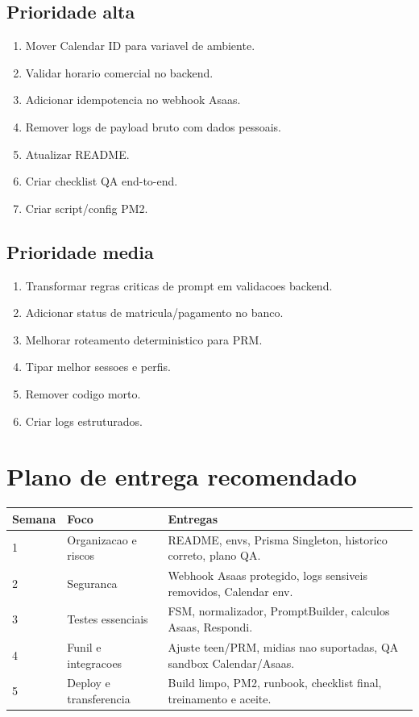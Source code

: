 \documentclass[11pt,a4paper]{article}
\begin{document}
\subsection{Prioridade alta}

\begin{enumerate}
  \item Mover Calendar ID para variavel de ambiente.
  \item Validar horario comercial no backend.
  \item Adicionar idempotencia no webhook Asaas.
  \item Remover logs de payload bruto com dados pessoais.
  \item Atualizar README.
  \item Criar checklist QA end-to-end.
  \item Criar script/config PM2.
\end{enumerate}

\subsection{Prioridade media}

\begin{enumerate}
  \item Transformar regras criticas de prompt em validacoes backend.
  \item Adicionar status de matricula/pagamento no banco.
  \item Melhorar roteamento deterministico para PRM.
  \item Tipar melhor sessoes e perfis.
  \item Remover codigo morto.
  \item Criar logs estruturados.
\end{enumerate}

\section{Plano de entrega recomendado}

\begin{longtable}{p{}p{}p{}}
\toprule
\textbf{Semana} & \textbf{Foco} & \textbf{Entregas} \\
\midrule
1 & Organizacao e riscos & README, envs, Prisma Singleton, historico correto, plano QA. \\
2 & Seguranca & Webhook Asaas protegido, logs sensiveis removidos, Calendar env. \\
3 & Testes essenciais & FSM, normalizador, PromptBuilder, calculos Asaas, Respondi. \\
4 & Funil e integracoes & Ajuste teen/PRM, midias nao suportadas, QA sandbox Calendar/Asaas. \\
5 & Deploy e transferencia & Build limpo, PM2, runbook, checklist final, treinamento e aceite. \\
\bottomrule
\end{longtable}
\end{document}

